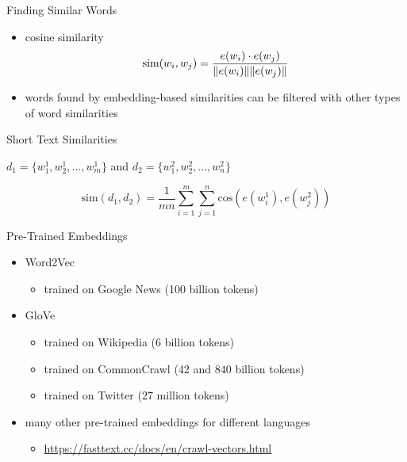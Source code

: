 \documentclass[12pt, handout]{beamer}
\begin{document}
\begin{frame}{Finding Similar Words}
	\begin{itemize}
		\item<4-> cosine similarity
		\begin{equation*}
		\text{sim}(w_i,w_j) = \frac{e(w_i) \cdot e(w_j)}{\norm{e(w_i)} \norm{e(w_j)}}
		\end{equation*} 
		\item words found by embedding-based similarities can be filtered with other types of word similarities 
	\end{itemize}
\end{frame}
\begin{frame}{Short Text Similarities}
	
$d_1 = \{ w^1_1, w^1_2, ..., w^1_m \}$ and $d_2 = \{ w^2_1, w^2_2, ..., w^2_n \}$

\begin{equation*}
\text{sim}(d_1, d_2) = \frac{1}{m n}\sum_{i = 1}^m \sum_{j=1}^{n} \text{cos} \left( e(w_i^1), e(w_j^2) \right)
\end{equation*}
		

\end{frame} 


 \begin{frame}{Pre-Trained Embeddings}
	\begin{itemize}
		\item Word2Vec
		\begin{itemize}
			\item trained on Google News (100 billion tokens)
		\end{itemize}
		\item GloVe
		\begin{itemize}
			\item trained on Wikipedia (6 billion tokens)
			\item trained on CommonCrawl (42 and 840 billion tokens)
			\item trained on Twitter (27 million tokens)
		\end{itemize}
		\item many other pre-trained embeddings for different languages 
		\begin{itemize}
			\item \url{https://fasttext.cc/docs/en/crawl-vectors.html}
		\end{itemize}
	\end{itemize}
\end{frame}
\end{document}
